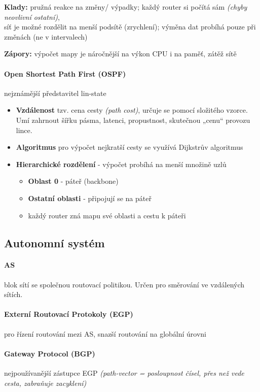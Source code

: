 \documentclass[10pt,a4paper]{article}
\begin{document}
\textbf{Klady:} pružná reakce na změny/ výpadky; každý router si počítá sám \textit{(chyby neovlivní ostatní)},\\ 
síť je možné rozdělit na menší podsítě (zrychlení); výměna dat probíhá pouze při změnách (ne v intervalech)

\textbf{Zápory:} výpočet mapy je náročnější na výkon CPU i na paměť, zátěž sítě


\paragraph*{Open Shortest Path First (OSPF)} nejznámější představitel lin-state
\begin{itemize}
    \item \textbf{Vzdálenost} tzv. cena cesty \textit{(path cost)}, určuje se pomocí složitého vzorce.\\Umí zahrnout šířku pásma, latenci, propustnost, skutečnou „cenu“ provozu lince.    
    \item \textbf{Algoritmus}  pro výpočet nejkratší cesty se využívá Dijkstrův algoritmus
    \item \textbf{Hierarchické rozdělení} - výpočet probíhá na menší množině uzlů
    \begin{itemize}
        \item \textbf{Oblast 0} - páteř (backbone)
        \item \textbf{Ostatní oblasti} - připojují se na páteř
        \item  každý router zná mapu své oblasti a cestu k páteři
    \end{itemize}
\end{itemize}


\subsection{Autonomní systém}

\paragraph*{AS} blok sítí se společnou routovací politikou. Určen pro směrování ve vzdálených sítích. 

\paragraph{Externí Routovací Protokoly (EGP)} pro řízení routování mezi AS, snazší routování na globální úrovni
\paragraph{Gateway Protocol (BGP)} nejpoužívanější zástupce EGP \textit{(path-vector = posloupnost čísel, přes než vede cesta, zabraňuje zacyklení)}
\end{document}
